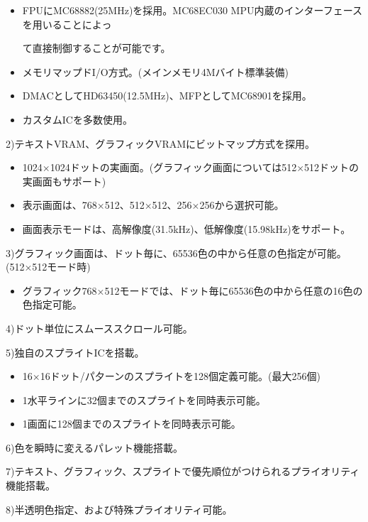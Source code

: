 \documentclass[twoside,a4paper,12pt]{article}
\begin{document}
\begin{itemize}[leftmargin=30mm, itemsep=-1mm, topsep=1mm]
\item
FPUにMC68882(25MHz)を採用。MC68EC030 MPU内蔵のインターフェースを用いることによっ

て直接制御することが可能です。
\item
メモリマップドI/O方式。(メインメモリ4Mバイト標準装備)
\item
DMACとしてHD63450(12.5MHz)、MFPとしてMC68901を採用。
\item
カスタムICを多数使用。
\end{itemize}

2)テキストVRAM、グラフィックVRAMにビットマップ方式を探用。

\begin{itemize}[leftmargin=30mm, itemsep=-1mm, topsep=1mm]
\item
1024×1024ドットの実画面。(グラフィック画面については512×512ドットの実画面もサポート)
\item
表示画面は、768×512、512×512、256×256から選択可能。
\item
画面表示モードは、高解像度(31.5kHz)、低解像度(15.98kHz)をサポート。
\end{itemize}

3)グラフィック画面は、ドット毎に、65536色の中から任意の色指定が可能。(512×512モード時)

\begin{itemize}[leftmargin=30mm, itemsep=-1mm, topsep=1mm]
\item
グラフィック768×512モードでは、ドット毎に65536色の中から任意の16色の色指定可能。
\end{itemize}

4)ドット単位にスムーススクロール可能。

5)独自のスプライトICを搭載。

\begin{itemize}[leftmargin=30mm, itemsep=-1mm, topsep=1mm]
\item
16×16ドット/パ夕ーンのスプライトを128個定義可能。(最大256個)
\item
1水平ラインに32個までのスプライトを同時表示可能。
\item
1画面に128個までのスプライトを同時表示可能。
\end{itemize}

6)色を瞬時に変えるパレット機能搭載。

7)テキスト、グラフィック、スプライトで優先順位がつけられるプライオリティ機能搭載。

8)半透明色指定、および特殊プライオリティ可能。
\end{document}
